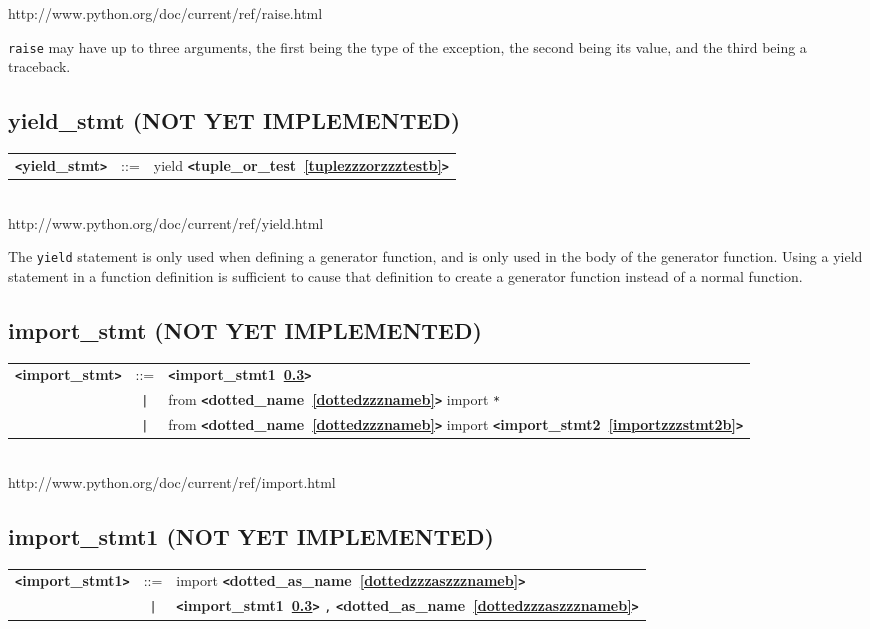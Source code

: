 \documentclass[12pt]{article}
\begin{document}
http://www.python.org/doc/current/ref/raise.html

\verb|raise| may have up to three arguments, the first being the type of the exception,
the second being its value, and the third being a traceback.

\subsection{yield\_stmt (NOT YET IMPLEMENTED)}
\label{yieldzzzstmtb}
\begin{tabular}{lcl}
{\bf \verb+<+yield\_stmt\verb+>+} & ::=  & yield {\bf \verb+<+tuple\_or\_test~\ref{tuplezzzorzzztestb}\verb+>+}  \\
\end{tabular} \\

http://www.python.org/doc/current/ref/yield.html

The \verb|yield| statement is only used when defining a generator function, 
and is only used in the body of the generator function. Using a yield 
statement in a function definition is sufficient to cause that definition 
to create a generator function instead of a normal function.

\subsection{import\_stmt (NOT YET IMPLEMENTED)}
\label{importzzzstmtb}
\begin{tabular}{lcl}
{\bf \verb+<+import\_stmt\verb+>+} & ::=  & {\bf \verb+<+import\_stmt1~\ref{importzzzstmt1b}\verb+>+}  \\
 & \verb+|+  & from {\bf \verb+<+dotted\_name~\ref{dottedzzznameb}\verb+>+}  import \verb|*| \\
 & \verb+|+  & from {\bf \verb+<+dotted\_name~\ref{dottedzzznameb}\verb+>+}  import {\bf \verb+<+import\_stmt2~\ref{importzzzstmt2b}\verb+>+}  \\
\end{tabular} \\

http://www.python.org/doc/current/ref/import.html

\subsection{import\_stmt1 (NOT YET IMPLEMENTED)}
\label{importzzzstmt1b}
\begin{tabular}{lcl}
{\bf \verb+<+import\_stmt1\verb+>+} & ::=  & import {\bf \verb+<+dotted\_as\_name~\ref{dottedzzzaszzznameb}\verb+>+}  \\
 & \verb+|+  & {\bf \verb+<+import\_stmt1~\ref{importzzzstmt1b}\verb+>+}  \verb|,| {\bf \verb+<+dotted\_as\_name~\ref{dottedzzzaszzznameb}\verb+>+}  \\
\end{tabular}
\end{document}
